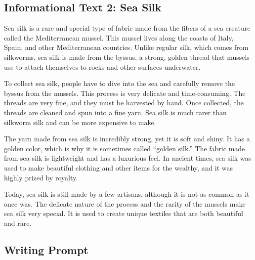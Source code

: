 \documentclass[12pt]{article}
\begin{document}

\subsection*{Informational Text 2: Sea Silk}

\begin{tcolorbox}[colframe=black!40, colback=gray!5]

\begin{spacing}{1.15}
    Sea silk is a rare and special type of fabric made from the fibers of a sea creature called the Mediterranean mussel. This mussel lives along the coasts of Italy, Spain, and other Mediterranean countries. Unlike regular silk, which comes from silkworms, sea silk is made from the byssus, a strong, golden thread that mussels use to attach themselves to rocks and other surfaces underwater.

    To collect sea silk, people have to dive into the sea and carefully remove the byssus from the mussels. This process is very delicate and time-consuming. The threads are very fine, and they must be harvested by hand. Once collected, the threads are cleaned and spun into a fine yarn. Sea silk is much rarer than silkworm silk and can be more expensive to make.

    The yarn made from sea silk is incredibly strong, yet it is soft and shiny. It has a golden color, which is why it is sometimes called “golden silk.” The fabric made from sea silk is lightweight and has a luxurious feel. In ancient times, sea silk was used to make beautiful clothing and other items for the wealthy, and it was highly prized by royalty.

    Today, sea silk is still made by a few artisans, although it is not as common as it once was. The delicate nature of the process and the rarity of the mussels make sea silk very special. It is used to create unique textiles that are both beautiful and rare.

\end{spacing}

\end{tcolorbox}

\vspace{1cm}


\subsection*{Writing Prompt}
\end{document}
